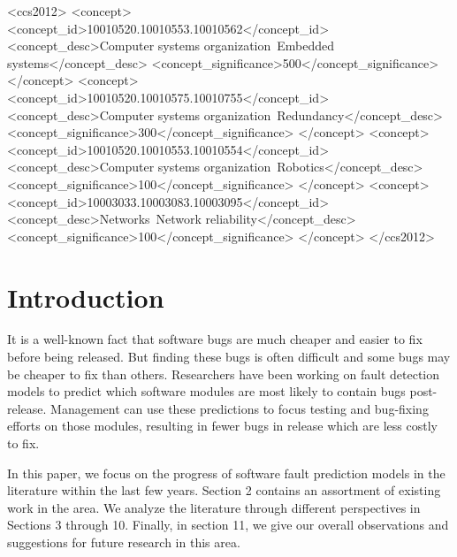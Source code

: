 \documentclass{sig-alternate-05-2015}
\begin{document}
%
%
\begin{CCSXML}
<ccs2012>
 <concept>
  <concept_id>10010520.10010553.10010562</concept_id>
  <concept_desc>Computer systems organization~Embedded systems</concept_desc>
  <concept_significance>500</concept_significance>
 </concept>
 <concept>
  <concept_id>10010520.10010575.10010755</concept_id>
  <concept_desc>Computer systems organization~Redundancy</concept_desc>
  <concept_significance>300</concept_significance>
 </concept>
 <concept>
  <concept_id>10010520.10010553.10010554</concept_id>
  <concept_desc>Computer systems organization~Robotics</concept_desc>
  <concept_significance>100</concept_significance>
 </concept>
 <concept>
  <concept_id>10003033.10003083.10003095</concept_id>
  <concept_desc>Networks~Network reliability</concept_desc>
  <concept_significance>100</concept_significance>
 </concept>
</ccs2012>  
\end{CCSXML}



%
%

%
%



\section{Introduction}
It is a well-known fact that software bugs are much cheaper and easier to fix before being released. But finding these bugs is often difficult and some bugs may be cheaper to fix than others. Researchers have been working on fault detection models to predict which software modules are most likely to contain bugs post-release. Management can use these predictions to focus testing and bug-fixing efforts on those modules, resulting in fewer bugs in release which are less costly to fix.

In this paper, we focus on the progress of software fault prediction models in the literature within the last few years. Section 2 contains an assortment of existing work in the area. We analyze the literature through different perspectives in Sections 3 through 10. Finally, in section 11, we give our overall observations and suggestions for future research in this area.
\end{document}
